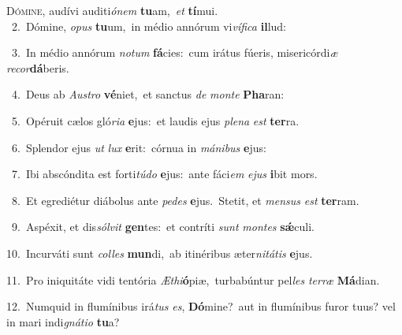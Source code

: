 \lettrine{\initial\textcolor{\initialcolor}{D}}{ómine,} audívi auditi\-\textit{ó}\-\textit{nem} \textbf{tu}\-am,~\star \textit{et} \textbf{tí}\-mui.\\
{\numbfont\textcolor{\numbcolor}{~2.}}~Dómine, \textit{o}\-\textit{pus} \textbf{tu}\-um,~\star in médio annórum vi\-\textit{ví}\-\textit{fi}\textit{ca} \textbf{il}\-lud:\par
{\numbfont\textcolor{\numbcolor}{~3.}}~In médio annórum \textit{no}\-\textit{tum} \textbf{fá}\-cies:~\star cum irátus fúeris, misericórdi\textit{æ} \textit{re}\-\textit{cor}\textbf{dá}beris.\par
{\numbfont\textcolor{\numbcolor}{~4.}}~Deus ab \textit{Aus}\-\textit{tro} \textbf{vé}\-niet,~\star et sanctus \textit{de} \textit{mon}\-\textit{te} \textbf{Pha}\-ran:\par
{\numbfont\textcolor{\numbcolor}{~5.}}~Opéruit cælos gló\-\textit{ri}\-\textit{a} \textbf{e}\-jus:~\star et laudis ejus \textit{ple}\-\textit{na} \textit{est} \textbf{ter}\-ra.\par
{\numbfont\textcolor{\numbcolor}{~6.}}~Splendor ejus \textit{ut} \textit{lux} \textbf{e}\-rit:~\star córnua in \textit{má}\-\textit{ni}\textit{bus} \textbf{e}\-jus:\par
{\numbfont\textcolor{\numbcolor}{~7.}}~Ibi abscóndita est forti\-\textit{tú}\-\textit{do} \textbf{e}\-jus:~\star ante fáci\textit{em} \textit{e}\-\textit{jus} \textbf{i}\-bit mors.\par
{\numbfont\textcolor{\numbcolor}{~8.}}~Et egrediétur diábolus ante \textit{pe}\-\textit{des} \textbf{e}\-jus.~\star Stetit, et \textit{men}\-\textit{sus} \textit{est} \textbf{ter}\-ram.\par
{\numbfont\textcolor{\numbcolor}{~9.}}~Aspéxit, et dis\-\textit{sól}\-\textit{vit} \textbf{gen}\-tes:~\star et contríti \textit{sunt} \textit{mon}\-\textit{tes} \textbf{sǽ}\-culi.\par
{\numbfont\textcolor{\numbcolor}{10.}}~Incurváti sunt \textit{col}\-\textit{les} \textbf{mun}\-di,~\star ab itinéribus æter\-\textit{ni}\-\textit{tá}\textit{tis} \textbf{e}\-jus.\par
{\numbfont\textcolor{\numbcolor}{11.}}~Pro iniquitáte vidi tentória \textit{Æ}\-\textit{thi}\textbf{ó}piæ,~\star turbabúntur pel\textit{les} \textit{ter}\-\textit{ræ} \textbf{Má}\-dian.\par
{\numbfont\textcolor{\numbcolor}{12.}}~Numquid in flumínibus irá\textit{tus} \textit{es}\-, \textbf{Dó}\-mine?~\star aut in flumínibus furor tuus? vel in mari indi\-\textit{gná}\-\textit{ti}\textit{o} \textbf{tu}\-a?\par
